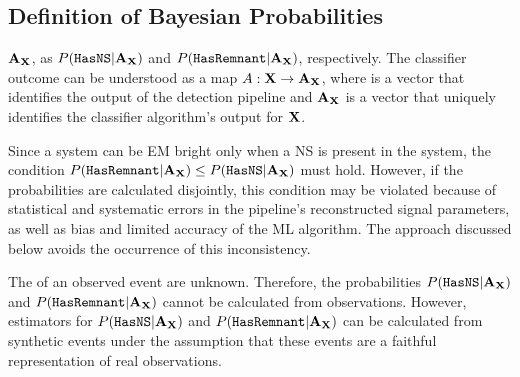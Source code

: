 \subsection{Definition of Bayesian Probabilities} \label{bayesian_probs}

 ${\bf A}_{\bf X}$, as $P({{\tt HasNS}}|{\bf A}_{\bf X})$ and $P({{\tt HasRemnant}}|{\bf A}_{\bf X})$, respectively. The classifier outcome can be understood as a map $A:{\bf X}\to {\bf A}_{\bf X}$,
where  is a vector that identifies the output of the detection pipeline and ${\bf A}_{\bf X}$ is a vector that uniquely identifies the classifier algorithm's output for $\bf X$. 

Since a system can be \ac{EM} bright only when a \ac{NS} is present in the system, the condition $P({{\tt HasRemnant}}|{\bf A}_{\bf X})\le P({{\tt HasNS}}|{\bf A}_{\bf X})$ must hold. However, if the
probabilities are calculated disjointly, this condition may be violated because of statistical and systematic errors in the pipeline's reconstructed signal parameters, as well as bias and
limited accuracy of the \ac{ML} algorithm. The approach discussed below avoids the occurrence of this inconsistency.

The  of an observed event are unknown. Therefore, the probabilities $P({{\tt HasNS}}|{\bf A}_{\bf X})$ and $P({{\tt HasRemnant}}|{\bf A}_{\bf X})$ cannot be calculated from observations. However,
estimators for $P({{\tt HasNS}}|{\bf A}_{\bf X})$ and $P({{\tt HasRemnant}}|{\bf A}_{\bf X})$ can be calculated from synthetic events under the assumption that these events are a faithful representation of
real observations. 

